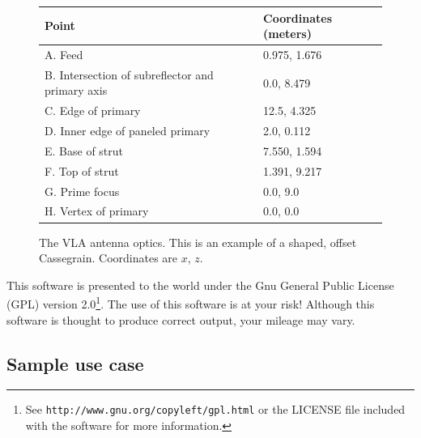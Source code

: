 \documentclass{article}
\begin{document}
\begin{figure}[h!]
\begin{center}
\begin{tabular}{|l|l|}  \hline
\footnotesize
Point & Coordinates (meters) \\ \hline \hline
A. Feed						& 0.975, 1.676 \\ \hline
B. Intersection of subreflector and primary axis& 0.0, 8.479   \\ \hline
C. Edge of primary				& 12.5, 4.325  \\ \hline
D. Inner edge of paneled primary		& 2.0, 0.112   \\ \hline
E. Base of strut				& 7.550, 1.594 \\ \hline
F. Top of strut					& 1.391, 9.217 \\ \hline
G. Prime focus					& 0.0, 9.0     \\ \hline
H. Vertex of primary				& 0.0, 0.0     \\ \hline
\end{tabular}
\end{center}
\caption{\label{fig:vlaant}
The VLA antenna optics.  This is an example of a shaped, offset Cassegrain.
Coordinates are $x$, $z$.}
\end{figure}

This software is presented to the world under the 
Gnu General Public License (GPL) version 2.0\footnote{See 
{\tt http://www.gnu.org/copyleft/gpl.html} or the LICENSE file included
with the software for more information.}.  The use of this software is at
your risk!  Although this software is thought to produce correct output,
your mileage may vary.

\subsection{Sample use case} \label{sec:use}
\end{document}
